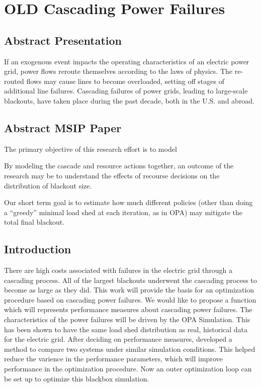 


\chapter{OLD Cascading Power Failures}

\section{Abstract Presentation}
If an exogenous event impacts the operating characteristics of an
electric power grid, power flows reroute themselves according to the
laws of physics.  The re-routed flows may cause lines to become
overloaded, setting off stages of additional line failures.
Cascading failures of power grids, leading to large-scale
blackouts, have taken place during the past decade, both in the
U.S. and abroad.  

\section{Abstract MSIP Paper}
The primary objective of this research effort is to model 

By modeling the cascade and resource actions together, an outcome of
the research may be to understand the effects of recourse decisions on
the distribution of blackout size.




Our short term goal is to estimate how much different policies (other
than doing a ``greedy'' minimal load shed at each iteration, as in
OPA) may mitigate the total final blackout.






\section{Introduction}
There are high costs associated with failures in the electric grid through a cascading process.  All of the largest blackouts underwent the cascading process to become as large as they did.  This work will provide the basis for an optimization procedure based on cascading power failures. We would like to propose a function which will represents performance measures about cascading power failures.  The characteristics of the power failures will be driven by the OPA Simulation.  This has been shown to have the same load shed distribution as real, historical data for the electric grid.  After deciding on performance measures, developed a method to compare two systems under similar simulation conditions.  This helped reduce the varience in the performance parameters, which will improve performance in the optimization procedure. Now an outer optimization loop can be set up to optimize this blackbox simulation.
